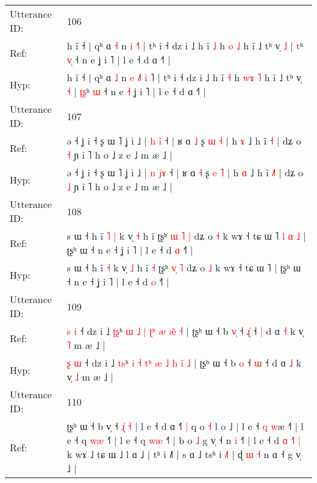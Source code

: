 \documentclass[10pt]{article}
\DeclareRobustCommand{\hl}[1]{{\textcolor{red}{#1}}}
\begin{document}
\begin{longtable}{ll}
 \\
\midrule
Utterance ID: & 106 \\
Ref: & h ĩ ˧ | qʰ ɑ \hl{˧} n\hl{}\hl{} \hl{}\hl{i} \hl{}\hl{˧}˥ | tʰ i ˧ dz i ˩ h ĩ \hl{˩} h \hl{}\hl{o} \hl{˩} h ĩ ˩ tʰ v̩ \hl{˩} | \hl{}\hl{t}ʰ \hl{v}\hl{̩} ˧ n e\hl{}\hl{} ʝ i ˥ | l e ˧ d ɑ ˧˥ |
 \\
Hyp: & h ĩ ˧ | qʰ ɑ \hl{˩} n\hl{ }\hl{e} \hl{˩}\hl{˥} \hl{i}\hl{ }˥ | tʰ i ˧ dz i ˩ h ĩ \hl{˧} h \hl{w}\hl{ɤ} \hl{˥} h ĩ ˩ tʰ v̩ \hl{˧} | \hl{ʈ}\hl{ʂ}ʰ \hl{}\hl{ɯ} ˧ n e\hl{ }\hl{˧} ʝ i ˥ | l e ˧ d ɑ ˧˥ |
 \\
\midrule
Utterance ID: & 107 \\
Ref: & ə ˧ ʝ i ˧ ʂ ɯ ˥ ʝ i ˩ | \hl{h} \hl{i}\hl{̃} ˧ | ʁ ɑ \hl{˩} ʂ \hl{ɯ} \hl{˧} | h \hl{ɤ} ˩ h ĩ \hl{}\hl{˧} | dʑ o \hl{˧} ɲ i ˥ h o ˩ z e ˩ m æ ˩ |
 \\
Hyp: & ə ˧ ʝ i ˧ ʂ ɯ ˥ ʝ i ˩ | \hl{n} \hl{j}\hl{ɤ} ˧ | ʁ ɑ \hl{˧} ʂ \hl{e} \hl{˥} | h \hl{ɑ} ˩ h ĩ \hl{˩}\hl{˥} | dʑ o \hl{˩} ɲ i ˥ h o ˩ z e ˩ m æ ˩ |
 \\
\midrule
Utterance ID: & 108 \\
Ref: & s ɯ ˧ h ĩ\hl{ }\hl{˥} \hl{|} k v̩ \hl{˧} h ĩ\hl{}\hl{} ʈʂʰ \hl{ɯ}\hl{ }\hl{˥} \hl{|} dʑ o \hl{˧} k wɤ ˧ tɕ ɯ ˥\hl{ }\hl{l}\hl{ }\hl{ɑ}\hl{ }\hl{˩} | ʈʂʰ ɯ ˧ n e ˧ ʝ i ˥ | l e ˧ d \hl{ɑ} ˧˥ |
 \\
Hyp: & s ɯ ˧ h ĩ\hl{}\hl{} \hl{˧} k v̩ \hl{˩} h ĩ\hl{ }\hl{˧} ʈʂʰ \hl{}\hl{v}\hl{̩} \hl{˥} dʑ o \hl{˩} k wɤ ˧ tɕ ɯ ˥\hl{}\hl{}\hl{}\hl{}\hl{}\hl{} | ʈʂʰ ɯ ˧ n e ˧ ʝ i ˥ | l e ˧ d \hl{o} ˧˥ |
 \\
\midrule
Utterance ID: & 109 \\
Ref: & \hl{s} \hl{i} ˧ dz i ˩ \hl{ʈ}\hl{ʂ}ʰ \hl{ɯ} \hl{˩} \hl{}\hl{|} \hl{}\hl{ʈ}\hl{ʰ} \hl{æ} \hl{æ}̃ \hl{˧} | ʈʂʰ ɯ ˧ b \hl{v}\hl{̩} ˧ \hl{ɻ}\hl{̍} ˧\hl{ }\hl{|} d ɑ \hl{˧} k v̩ \hl{˥} m æ ˩ |
 \\
Hyp: & \hl{ʂ} \hl{ɯ} ˧ dz i ˩ \hl{t}\hl{s}ʰ \hl{i} \hl{˧} \hl{t}\hl{ʰ} \hl{æ}\hl{ }\hl{˩} \hl{h} \hl{i}̃ \hl{˩} | ʈʂʰ ɯ ˧ b \hl{}\hl{o} ˧ \hl{}\hl{ɯ} ˧\hl{}\hl{} d ɑ \hl{˩} k v̩ \hl{˩} m æ ˩ |
 \\
\midrule
Utterance ID: & 110 \\
Ref: & ʈʂʰ ɯ ˧ b v̩ ˧\hl{}\hl{} \hl{ɻ}\hl{̍} \hl{˧} | l e ˧ d ɑ ˧\hl{˥}\hl{ }\hl{|} q o \hl{˧} l o ˩ | l e ˧ \hl{q} \hl{w}æ ˧˥ | l e ˧ q\hl{} \hl{w}\hl{æ} ˧˥ | l e ˧ q\hl{ }\hl{w}\hl{æ} ˧˥ | b o \hl{˩} g v̩ ˧ n \hl{}\hl{i} ˧˥ | l e ˧ d\hl{ }\hl{ɑ} \hl{˧}\hl{˥} \hl{|} k wɤ ˩ tɕ ɯ ˩ l ɑ ˩ | tʰ i ˩˥ | s ɑ ˩ tsʰ i \hl{˩}˥ | ɖ \hl{ɯ} \hl{˧} n ɑ ˧ g v̩ ˩ |

\end{longtable}
\end{document}
